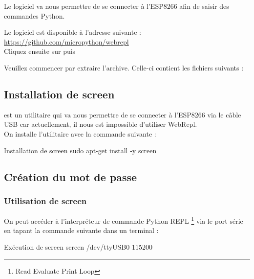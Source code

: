 Le logiciel  va nous permettre de se connecter à l'ESP8266 afin de saisir des commandes Python.

Le logiciel est disponible à l'adresse suivante : \\

\url{https://github.com/micropython/webrepl}\\

Cliquez ensuite sur  puis 


Veuillez commencer par extraire l'archive.
Celle-ci contient les fichiers suivants : 


\subsection{Installation de screen}

 est un utilitaire qui va nous permettre de se connecter à l'ESP8266 via le câble USB car actuellement, il nous est impossible d'utiliser WebRepl.\\
On installe l'utilitaire avec la commande suivante : 
\begin{Bash}{Installation de screen}
sudo apt-get install -y screen
\end{Bash}

\subsection{Création du mot de passe}

\subsubsection{Utilisation de screen}

On peut accéder à l’interpréteur de commande Python REPL \footnote{Read Evaluate Print Loop} via le port série en tapant la commande suivante dans un terminal :

\begin{Bash}{Exécution de screen}
screen /dev/ttyUSB0 115200
\end{Bash}



